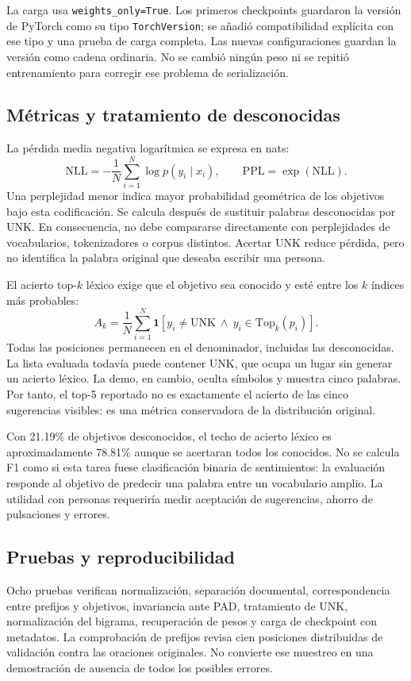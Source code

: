 La carga usa \texttt{weights\_only=True}. Los primeros checkpoints
guardaron la versión de PyTorch como su tipo \texttt{TorchVersion};
se añadió compatibilidad explícita con ese tipo y una prueba de
carga completa. Las nuevas configuraciones guardan la versión como
cadena ordinaria. No se cambió ningún peso ni se repitió entrenamiento
para corregir ese problema de serialización.

\subsection{Métricas y tratamiento de desconocidas}
La pérdida media negativa logarítmica se expresa en nats:
\begin{equation}
 \mathrm{NLL}=-\frac{1}{N}\sum_{i=1}^{N}\log p(y_i\mid x_i),
 \qquad \mathrm{PPL}=\exp(\mathrm{NLL}).
\end{equation}
Una perplejidad menor indica mayor probabilidad geométrica de los
objetivos bajo esta codificación. Se calcula después de sustituir
palabras desconocidas por UNK. En consecuencia, no debe compararse
directamente con perplejidades de vocabularios, tokenizadores o corpus
distintos. Acertar UNK reduce pérdida, pero no identifica la palabra
original que deseaba escribir una persona.

El acierto top-$k$ léxico exige que el objetivo sea conocido y esté
entre los $k$ índices más probables:
\begin{equation}
 A_k=\frac{1}{N}\sum_{i=1}^{N}
 \mathbf{1}[y_i\ne\mathrm{UNK}\ \land\ y_i\in\mathrm{Top}_k(p_i)].
\end{equation}
Todas las posiciones permanecen en el denominador, incluidas las
desconocidas. La lista evaluada todavía puede contener UNK, que ocupa
un lugar sin generar un acierto léxico. La demo, en cambio, oculta
símbolos y muestra cinco palabras. Por tanto, el top-5 reportado
no es exactamente el acierto de las cinco sugerencias visibles:
es una métrica conservadora de la distribución original.

Con 21.19\% de objetivos desconocidos, el techo de acierto léxico
es aproximadamente 78.81\% aunque se acertaran todos los conocidos.
No se calcula F1 como si esta tarea fuese clasificación binaria de
sentimientos: la evaluación responde al objetivo de predecir una
palabra entre un vocabulario amplio. La utilidad con personas requeriría
medir aceptación de sugerencias, ahorro de pulsaciones y errores.

\subsection{Pruebas y reproducibilidad}
Ocho pruebas verifican normalización, separación documental,
correspondencia entre prefijos y objetivos, invariancia ante PAD,
tratamiento de UNK, normalización del bigrama, recuperación de pesos
y carga de checkpoint con metadatos. La comprobación de prefijos
revisa cien posiciones distribuidas de validación contra las oraciones
originales. No convierte ese muestreo en una demostración de ausencia
de todos los posibles errores.

